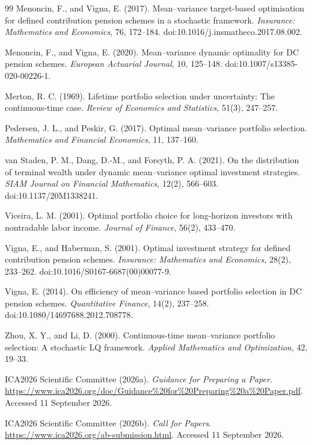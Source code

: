 \documentclass[10pt,a4paper]{article}
\numberwithin{equation}{section}
\numberwithin{table}{section}
\numberwithin{figure}{section}
\theoremstyle{plain}
\theoremstyle{definition}
\begin{document}
\begin{thebibliography}{99}
Menoncin, F., and Vigna, E. (2017).
Mean--variance target-based optimisation for defined contribution pension schemes in a stochastic framework.
\emph{Insurance: Mathematics and Economics}, 76, 172--184.
doi:10.1016/j.insmatheco.2017.08.002.

Menoncin, F., and Vigna, E. (2020).
Mean--variance dynamic optimality for DC pension schemes.
\emph{European Actuarial Journal}, 10, 125--148.
doi:10.1007/s13385-020-00226-1.

Merton, R. C. (1969).
Lifetime portfolio selection under uncertainty: The continuous-time case.
\emph{Review of Economics and Statistics}, 51(3), 247--257.

Pedersen, J. L., and Peskir, G. (2017).
Optimal mean--variance portfolio selection.
\emph{Mathematics and Financial Economics}, 11, 137--160.

van Staden, P. M., Dang, D.-M., and Forsyth, P. A. (2021).
On the distribution of terminal wealth under dynamic mean--variance optimal investment strategies.
\emph{SIAM Journal on Financial Mathematics}, 12(2), 566--603.
doi:10.1137/20M1338241.

Viceira, L. M. (2001).
Optimal portfolio choice for long-horizon investors with nontradable labor income.
\emph{Journal of Finance}, 56(2), 433--470.

Vigna, E., and Haberman, S. (2001).
Optimal investment strategy for defined contribution pension schemes.
\emph{Insurance: Mathematics and Economics}, 28(2), 233--262.
doi:10.1016/S0167-6687(00)00077-9.

Vigna, E. (2014).
On efficiency of mean--variance based portfolio selection in DC pension schemes.
\emph{Quantitative Finance}, 14(2), 237--258.
doi:10.1080/14697688.2012.708778.

Zhou, X. Y., and Li, D. (2000).
Continuous-time mean--variance portfolio selection: A stochastic LQ framework.
\emph{Applied Mathematics and Optimization}, 42, 19--33.

ICA2026 Scientific Committee (2026a).
\emph{Guidance for Preparing a Paper}.
\url{https://www.ica2026.org/doc/Guidance%20for%20Preparing%20a%20Paper.pdf}.
Accessed 11 September 2026.

ICA2026 Scientific Committee (2026b).
\emph{Call for Papers}.
\url{https://www.ica2026.org/ab-submission.html}.
Accessed 11 September 2026.
\end{thebibliography}\endgroup
\end{document}
